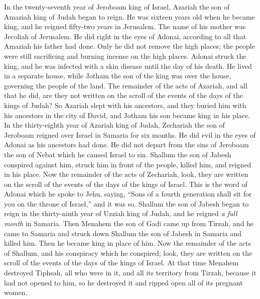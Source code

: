 \begin{biblechapter} %
 In the twenty-seventh year of Jeroboam king of Israel, Azariah the son of Amaziah king of Judah began to reign.
\verse He was sixteen years old when he became king, and he reigned fifty-two years in Jerusalem. The name of his mother was Jecoliah of Jerusalem.
\verse He did right in the eyes of Adonai, according to all that Amaziah his father had done.
\verse Only he did not remove the high places; the people were still sacrificing and burning incense on the high places.
\verse Adonai struck the king, and he was infected with a skin disease until the day of his death. He lived in a separate house, while Jotham the son of the king was over the house, governing the people of the land.
\verse The remainder of the acts of Azariah, and all that he did, are they not written on the scroll of the events of the days of the kings of Judah?
\verse So Azariah slept with his ancestors, and they buried him with his ancestors in the city of David, and Jotham his son became king in his place.
 In the thirty-eighth year of Azariah king of Judah, Zechariah the son of Jeroboam reigned over Israel in Samaria for six months.
\verse He did evil in the eyes of Adonai as his ancestors had done. He did not depart from the sins of Jeroboam the son of Nebat which he caused Israel to sin.
\verse Shallum the son of Jabesh conspired against him, struck him in front of the people, killed him, and reigned in his place.
\verse Now the remainder of the acts of Zechariah, look, they are written on the scroll of the events of the days of the kings of Israel.
\verse This is the word of Adonai which he spoke to Jehu, saying, “Sons of a fourth generation shall sit for you on the throne of Israel,” and it was so.
 Shallum the son of Jabesh began to reign in the thirty-ninth year of Uzziah king of Judah, and he reigned \textit{a full month} in Samaria.
\verse Then Menahem the son of Gadi came up from Tirzah, and he came to Samaria and struck down Shallum the son of Jabesh in Samaria and killed him. Then he became king in place of him.
\verse Now the remainder of the acts of Shallum, and his conspiracy which he conspired; look, they are written on the scroll of the events of the days of the kings of Israel.
\verse At that time Menahem destroyed Tiphsah, all who were in it, and all its territory from Tirzah, because it had not opened to him, so he destroyed it and ripped open all of its pregnant women.

\end{biblechapter}
